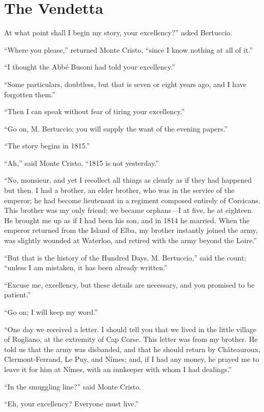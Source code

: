\chapter{The Vendetta}

At what point shall I begin my story, your excellency?” asked
Bertuccio.

“Where you please,” returned Monte Cristo, “since I know nothing at all
of it.”

“I thought the Abbé Busoni had told your excellency.”

“Some particulars, doubtless, but that is seven or eight years ago, and
I have forgotten them.”

“Then I can speak without fear of tiring your excellency.”

“Go on, M. Bertuccio; you will supply the want of the evening papers.”

“The story begins in 1815.”

“Ah,” said Monte Cristo, “1815 is not yesterday.”

“No, monsieur, and yet I recollect all things as clearly as if they had
happened but then. I had a brother, an elder brother, who was in the
service of the emperor; he had become lieutenant in a regiment composed
entirely of Corsicans. This brother was my only friend; we became
orphans—I at five, he at eighteen. He brought me up as if I had been
his son, and in 1814 he married. When the emperor returned from the
Island of Elba, my brother instantly joined the army, was slightly
wounded at Waterloo, and retired with the army beyond the Loire.”

“But that is the history of the Hundred Days, M. Bertuccio,” said the
count; “unless I am mistaken, it has been already written.”

“Excuse me, excellency, but these details are necessary, and you
promised to be patient.”

“Go on; I will keep my word.”

“One day we received a letter. I should tell you that we lived in the
little village of Rogliano, at the extremity of Cap Corse. This letter
was from my brother. He told us that the army was disbanded, and that
he should return by Châteauroux, Clermont-Ferrand, Le Puy, and Nîmes;
and, if I had any money, he prayed me to leave it for him at Nîmes,
with an innkeeper with whom I had dealings.”

“In the smuggling line?” said Monte Cristo.

“Eh, your excellency? Everyone must live.”

